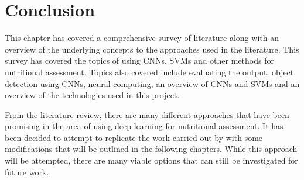 \section{Conclusion}
This chapter has covered a comprehensive survey of literature along with an overview of the underlying concepts to the approaches used in the literature.
This survey has covered the topics of using CNNs, SVMs and other methods for nutritional assessment.
Topics also covered include evaluating the output, object detection using CNNs, neural computing, an overview of CNNs and SVMs and an overview of the technologies used in this project.

From the literature review, there are many different approaches that have been promising in the area of using deep learning for nutritional assessment.
It has been decided to attempt to replicate the work carried out by \parencite{yanaiFood} with some modifications that will be outlined in the following chapters.
While this approach will be attempted, there are many viable options that can still be investigated for future work.


